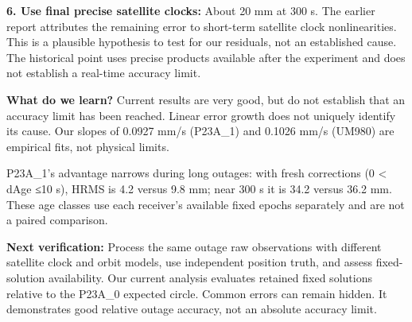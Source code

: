 \documentclass[11pt,a4paper]{article}
\begin{document}
\textbf{6. Use final precise satellite clocks:} About 20 mm at 300 s. The earlier report attributes the remaining error to short-term satellite clock nonlinearities. This is a plausible hypothesis to test for our residuals, not an established cause. The historical point uses precise products available after the experiment and does not establish a real-time accuracy limit.

\textbf{What do we learn?} Current results are very good, but do not establish that an accuracy limit has been reached. Linear error growth does not uniquely identify its cause. Our slopes of 0.0927 mm/s (P23A\_1) and 0.1026 mm/s (UM980) are empirical fits, not physical limits.

P23A\_1's advantage narrows during long outages: with fresh corrections (0 < dAge ≤10 s), HRMS is 4.2 versus 9.8 mm; near 300 s it is 34.2 versus 36.2 mm. These age classes use each receiver's available fixed epochs separately and are not a paired comparison.

\textbf{Next verification:} Process the same outage raw observations with different satellite clock and orbit models, use independent position truth, and assess fixed-solution availability. Our current analysis evaluates retained fixed solutions relative to the P23A\_0 expected circle. Common errors can remain hidden. It demonstrates good relative outage accuracy, not an absolute accuracy limit.
\end{document}
